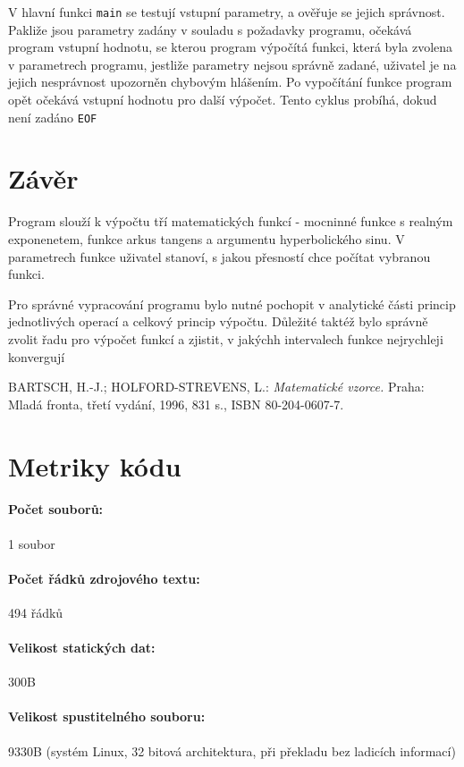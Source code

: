 \documentclass[12pt,a4paper,titlepage,final]{article}
\begin{document}
V hlavní funkci \texttt{main} se testují vstupní parametry, a ověřuje se jejich
správnost. Pakliže jsou parametry zadány v souladu s požadavky programu,
očekává program vstupní hodnotu, se kterou program výpočítá funkci, která byla
zvolena v parametrech programu, jestliže parametry nejsou správně zadané,
uživatel je na jejich nesprávnost upozorněn chybovým hlášením. Po vypočítání
funkce program opět očekává vstupní hodnotu pro další výpočet. Tento cyklus
probíhá, dokud není zadáno \texttt{EOF}

\section{Závěr} \label{zaver}

Program slouží k výpočtu tří matematických funkcí - mocninné funkce s realným
exponenetem, funkce arkus tangens a argumentu hyperbolického sinu.
V parametrech funkce uživatel stanoví, s jakou přesností chce počítat
vybranou funkci.

Pro správné vypracování programu bylo nutné pochopit v analytické části
princip jednotlivých operací a celkový princip výpočtu. Důležité taktéž bylo
správně zvolit řadu pro výpočet funkcí a zjistit, v jakýchh intervalech funkce
nejrychleji konvergují

\begin{thebibliography}{1}

BARTSCH, H.-J.; HOLFORD-STREVENS, L.: \emph{Matematické vzorce. } Praha:
Mladá fronta, třetí vydání, 1996, 831 s., 
ISBN 80-204-0607-7.


\end{thebibliography}
\appendix

\section{Metriky kódu} \label{metriky}
\paragraph{Počet souborů:} 1 soubor
\paragraph{Počet řádků zdrojového textu:} 494 řádků
\paragraph{Velikost statických dat:} 300B
\paragraph{Velikost spustitelného souboru:} 9330B (systém Linux, 32 bitová
architektura, při pře\-kladu bez ladicích informací)
\end{document}
